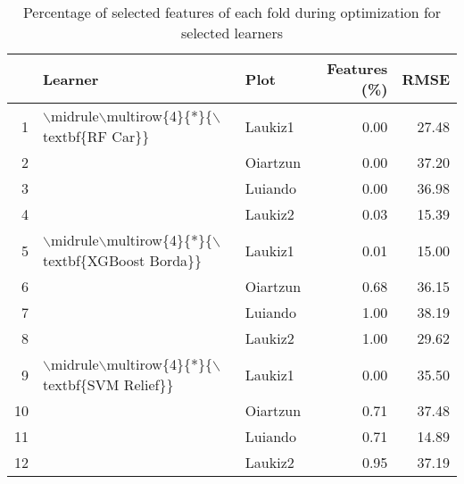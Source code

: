 \begin{table}[ht!]
\centering
\caption{Percentage of selected features of each fold during optimization for selected learners} 
\label{tab:tune-perc-sel-features}
\begin{tabular}{rllrr}
  \hline
 & Learner & Plot & Features (\%) & RMSE \\ 
  \hline
1 & $\backslash$midrule$\backslash$multirow\{4\}\{*\}\{$\backslash$textbf\{RF Car\}\} & Laukiz1 & 0.00 & 27.48 \\ 
  2 &  & Oiartzun & 0.00 & 37.20 \\ 
  3 &  & Luiando & 0.00 & 36.98 \\ 
  4 &  & Laukiz2 & 0.03 & 15.39 \\ 
  5 & $\backslash$midrule$\backslash$multirow\{4\}\{*\}\{$\backslash$textbf\{XGBoost Borda\}\} & Laukiz1 & 0.01 & 15.00 \\ 
  6 &  & Oiartzun & 0.68 & 36.15 \\ 
  7 &  & Luiando & 1.00 & 38.19 \\ 
  8 &  & Laukiz2 & 1.00 & 29.62 \\ 
  9 & $\backslash$midrule$\backslash$multirow\{4\}\{*\}\{$\backslash$textbf\{SVM Relief\}\} & Laukiz1 & 0.00 & 35.50 \\ 
  10 &  & Oiartzun & 0.71 & 37.48 \\ 
  11 &  & Luiando & 0.71 & 14.89 \\ 
  12 &  & Laukiz2 & 0.95 & 37.19 \\ 
   \hline
\end{tabular}
\end{table}

